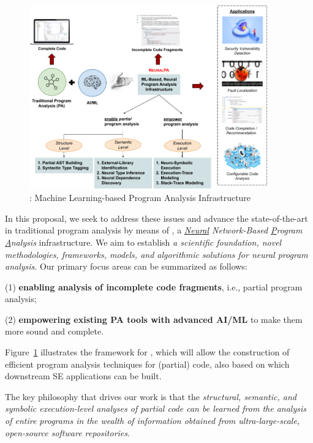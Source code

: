 \begin{figure}[t]
    \centering
    \includegraphics[width=0.92\textwidth]{figures/infra-design-3.png}
    \caption{{\tool}: Machine Learning-based Program Analysis Infrastructure}
    \label{fig:arch}
\end{figure}


In this proposal, we seek to address these issues and advance the state-of-the-art in traditional program analysis by means of {\tool}, a {\em \underline{Neural} Network-Based \underline{P}rogram \underline{A}nalysis} infrastructure. We aim to establish {\em a scientific foundation, novel methodologies, frameworks, models, and algorithmic solutions for neural program analysis}. Our primary focus areas can be summarized as follows: 

(1) {\bf enabling analysis of incomplete code fragments}, i.e., partial program analysis;

(2) {\bf empowering existing PA tools with advanced AI/ML
} to make them more sound and complete.

\noindent Figure~\ref{fig:arch} illustrates the 
framework for {\tool}, which will allow the construction of efficient program analysis techniques for (partial) code, also based on which downstream 
SE applications can be built.


\begin{center}
    \begin{minipage}{36em}
The key philosophy that drives our work is that the {\em structural, semantic, and symbolic execution-level analyses of partial code can be learned from the analysis of entire programs in the wealth of information obtained from ultra-large-scale, open-source software repositories}.
    \end{minipage}
\end{center}



